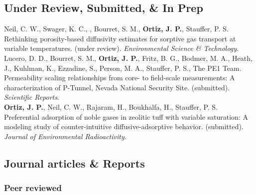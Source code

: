 \documentclass[11pt, letterpaper]{article}
\newcommand{\amper}{{\fontspec[Scale=.95]{Adobe Caslon Pro}\selectfont\itshape\&}}
\newcommand{\years}[1]{\marginnote{\scriptsize #1}}
\begin{document}
\subsection*{Under Review, Submitted, \& In Prep}
\noindent
\years{2024}Neil, C. W., Swager, K. C., , Bourret, S. M., \textbf{Ortiz, J.
P.}, Stauffer, P. S.
Rethinking porosity-based diffusivity estimates for sorptive gas transport at
variable temperatures.  (under review).
\emph{Environmental Science \& Technology}. \\
%
\years{2024}Lucero, D. D., Bourret, S. M., \textbf{Ortiz, J. P.}, Fritz, B. G.,
Bodmer, M. A., Heath, J., Kuhlman, K., Ezzadine, S., Person, M. A., Stauffer,
P. S., The PE1 Team. 
Permeability scaling relationships from core- to field-scale measurements: A
characterization of P-Tunnel, Nevada National Security Site. (submitted).
\emph{Scientific Reports}. \\
%
\years{2024}\textbf{Ortiz, J. P.}, Neil, C. W., Rajaram, H., Boukhalfa, H.,
Stauffer, P. S.  Preferential adsorption of noble gases in zeolitic tuff with
variable saturation: A modeling study of counter-intuitive diffusive-adsorptive
behavior. (submitted).  \emph{Journal of Environmental Radioactivity}.\\


\subsection*{Journal articles \& Reports}

\subsubsection*{Peer reviewed}
\end{document}

